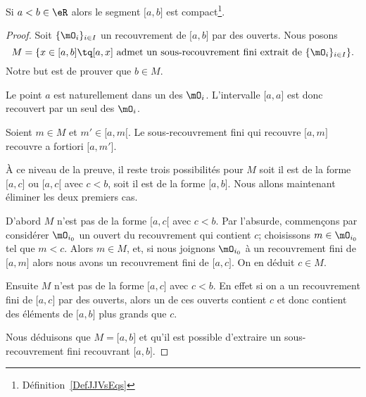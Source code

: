 \begin{lemma}\label{LemOACGWxV}
	Si \( a<b\in \eR\) alors le segment \( \mathopen[ a , b \mathclose]\) est compact\footnote{Définition~\ref{DefJJVsEqs}}.
\end{lemma}

\begin{proof}
	Soit \( \{ \mO_i \}_{i\in I}\) un recouvrement de \( \mathopen[ a , b \mathclose]\) par des ouverts. Nous posons
	\begin{equation}
		M=\{ x\in\mathopen[ a , b \mathclose]\tq \mathopen[ a , x \mathclose] \text{ admet un sous-recouvrement fini extrait de } \{ \mO_i \}_{i\in I} \}.
	\end{equation}
	Notre but est de prouver que \( b\in M\).
	\begin{subproof}

		\item[\( a\) est dans \( M\)]
		Le point \( a\) est naturellement dans un des \( \mO_i\). L'intervalle \( \mathopen[ a , a \mathclose]\) est donc recouvert par un seul des \( \mO_i\).

		\item[\( M\) est un intervalle]
		Soient \( m\in M\) et \( m'\in\mathopen[ a , m [\). Le sous-recouvrement fini qui recouvre \( \mathopen[ a , m \mathclose]\) recouvre a fortiori \( \mathopen[ a , m' \mathclose]\).

		\item[Les trois possibilités restantes]
		À ce niveau de la preuve, il reste trois possibilités pour \( M\) soit il est de la forme \( \mathopen[ a , c \mathclose]\) ou \( \mathopen[ a , c [\) avec \( c<b\), soit il est de la forme \( \mathopen[ a , b \mathclose]\). Nous allons maintenant éliminer les deux premiers cas.

		\item[Ce que \( M\) n'est pas]
		D'abord \( M\) n'est pas de la forme \( \mathopen[ a , c [\) avec \( c<b\). Par l'absurde, commençons par considérer \( \mO_{i_0}\) un ouvert du recouvrement qui contient \( c\); choisissons  \(m \in \mO_{i_0}\) tel que \( m<c\). Alors \( m \in M \), et, si nous joignons \( \mO_{i_0}\) à un recouvrement fini de \( \mathopen[ a , m \mathclose]\) alors nous avons un recouvrement fini de \( \mathopen[ a , c \mathclose]\). On en déduit \( c\in M\).

		Ensuite \( M\) n'est pas de la forme \( \mathopen[ a , c \mathclose]\) avec \( c<b\). En effet si on a un recouvrement fini de \( \mathopen[ a , c \mathclose]\) par des ouverts, alors un de ces ouverts contient \( c\) et donc contient des éléments de \( \mathopen[ a , b \mathclose]\) plus grands que \( c\).
	\end{subproof}
	Nous déduisons que \( M=\mathopen[ a , b \mathclose]\) et qu'il est possible d'extraire un sous-recouvrement fini recouvrant \( \mathopen[ a , b \mathclose]\).
\end{proof}

